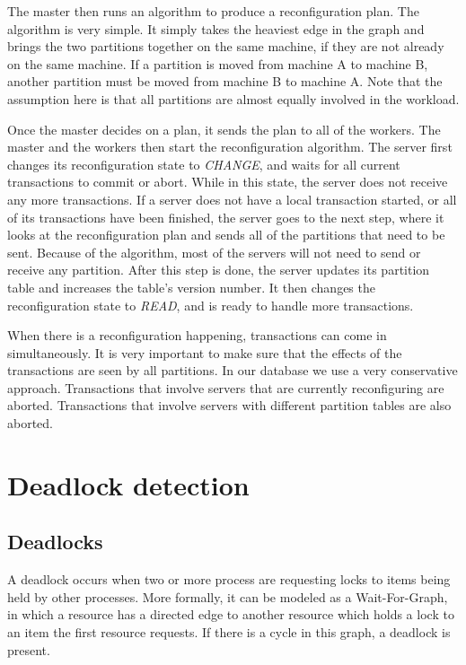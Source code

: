 \documentclass[a4paper, 10pt, notitlepage]{article}
\begin{document}
The master then runs an algorithm to produce a reconfiguration plan. The algorithm is very simple. It simply takes the heaviest
edge in the graph and brings the two partitions together on the same machine, if they are not already on the same machine.
If a partition is moved from machine A to machine B, another partition must be moved from machine B to machine A. Note that the
assumption here is that all partitions are almost equally involved in the workload. 

Once the master decides on a plan, it sends the plan to all of the workers. The master and the workers then start the reconfiguration
algorithm. The server first changes its reconfiguration state to {\em CHANGE}, and waits for all current transactions to commit
or abort. While in this state, the server does not receive any more transactions.
If a server does not have a local transaction started, or all of its transactions have been finished, the server goes
to the next step, where it looks at the reconfiguration plan and sends all of the partitions that need to be sent. Because of the 
algorithm, most of the servers will not need to send or receive any partition. After this step is done, the server updates its
partition table and increases the table's version number. It then changes the reconfiguration state to {\em READ}, and is ready
to handle more transactions.

When there is a reconfiguration happening, transactions can come in simultaneously. It is very important to make sure that the effects
of the transactions are seen by all partitions. In our database we use a very conservative approach. Transactions that involve servers
that are currently reconfiguring are aborted. Transactions that involve servers with different partition tables are also aborted.


\section{Deadlock detection}

\subsection{Deadlocks}
A deadlock occurs when two or more process are requesting locks to items being held by other processes. More formally, it can be modeled as a Wait-For-Graph, in which a resource has a directed edge to another resource which holds a lock to an item the first resource requests. If there is a cycle in this graph, a deadlock is present.
\end{document}
